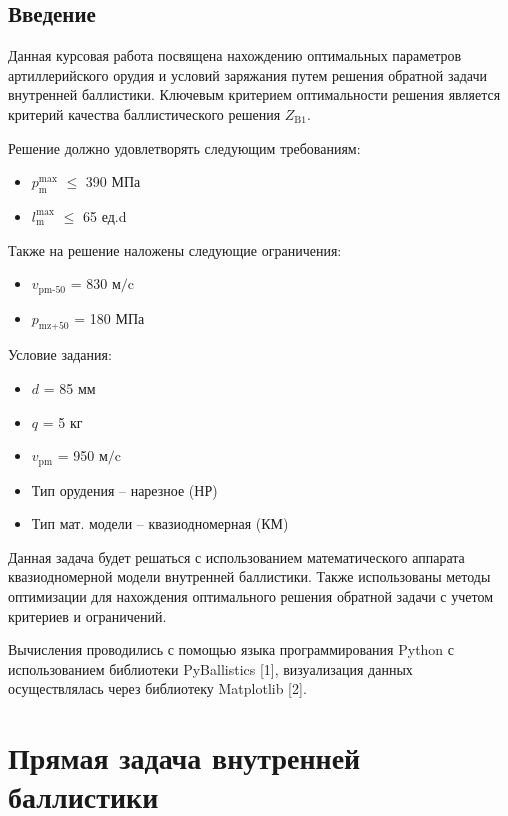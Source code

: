 \documentclass[14pt, a4paper]{extreport} %
\begin{document}


\newpage
\tableofcontents

\newpage
\section*{Введение}
Данная курсовая работа посвящена нахождению оптимальных параметров артиллерийского орудия и условий заряжания путем решения обратной задачи внутренней баллистики.
Ключевым критерием оптимальности решения является критерий качества баллистического решения $Z_{\text{B1}}$. 

Решение должно удовлетворять следующим требованиям: 
\begin{itemize}
    \item  $p_{\text{m}}^{\text{max}}$ $\leq$ 390 МПа
    \item $l_{\text{m}}^{\text{max}}$ $\leq$ 65 ед.d
\end{itemize}

Также на решение наложены следующие ограничения: 
\begin{itemize}
    \item  $v_{\text{pm-50}}$ = 830 $\text{м/c}$
    \item $p_{\text{mz+50}}$ = 180 МПа
\end{itemize}

Условие задания: 
\begin{itemize}
    \item $d$ = 85 мм
    \item $q$ = 5 кг
    \item $v_{\text{pm}}$ = 950 $\text{м/c}$
    \item Тип орудения -- нарезное (НР)
    \item Тип мат. модели -- квазиодномерная (КМ)
\end{itemize}

Данная задача будет решаться с использованием математического аппарата квазиодномерной модели внутренней
баллистики. Также использованы методы оптимизации для нахождения оптимального решения обратной задачи с учетом критериев и ограничений.

Вычисления проводились с помощью языка программирования Python с использованием библиотеки PyBallistics [1], визуализация данных осуществлялась 
через библиотеку Matplotlib [2].

\newpage
\chapter{Прямая задача внутренней баллистики}
\end{document}
